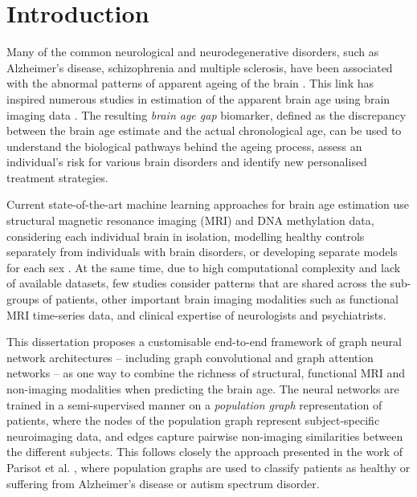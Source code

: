 \chapter{Introduction}



Many of the common neurological and neurodegenerative disorders, such as Alzheimer’s disease, schizophrenia and multiple sclerosis, have been associated with the abnormal patterns of apparent ageing of the brain \cite{kaufmann2019}. This link has inspired numerous studies in estimation of the apparent brain age using brain imaging data \cite{franke2019ten}. The resulting \textit{brain age gap} biomarker, defined as the discrepancy between the brain age estimate and the actual chronological age, can be used to understand the biological pathways behind the ageing process, assess an individual’s risk for various brain disorders and identify new personalised treatment strategies.

Current state-of-the-art machine learning approaches for brain age estimation use structural magnetic resonance imaging (MRI) and DNA methylation data, considering each individual brain in isolation, modelling healthy controls separately from individuals with brain disorders, or developing separate models for each sex \cite{kaufmann2019,niu2019improved}. At the same time, due to high computational complexity and lack of available datasets, few studies consider patterns that are shared across the sub-groups of patients, other important brain imaging modalities such as functional MRI time-series data, and clinical expertise of neurologists and psychiatrists.

This dissertation proposes a customisable end-to-end framework of graph neural network architectures – including graph convolutional \cite{kipf2017semi} and graph attention \cite{velickovic2018graph} networks – as one way to combine the richness of structural, functional MRI and non-imaging modalities when predicting the brain age. The neural networks are trained in a semi-supervised manner on a \textit{population graph} representation of patients, where the nodes of the population graph represent subject-specific neuroimaging data, and edges capture pairwise non-imaging similarities between the different subjects. This follows closely the approach presented in the work of Parisot et al. \cite{parisot2017spectral,parisot2018disease}, where population graphs are used to classify patients as healthy or suffering from Alzheimer's disease or autism spectrum disorder.

